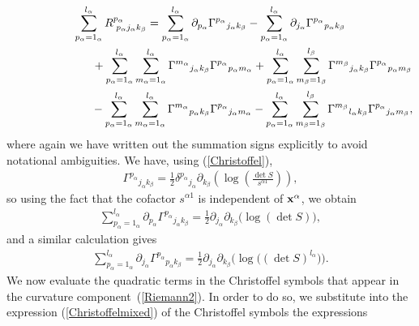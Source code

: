 \documentclass[11pt]{article}
\numberwithin{equation}{section}
\newcommand{\jalpha}{j_{\alpha}}
\newcommand{\kbeta}{k_{\beta}}
\newcommand{\malpha}{m_{\alpha}}
\newcommand{\mbeta}{m_{\beta}}
\newcommand{\lbeta}{l_{\beta}}
\newcommand{\lalpha}{l_{\alpha}}
\newcommand{\palpha}{p_{\alpha}}
\begin{document}
\begin{gather}
\sum_{\palpha=1_{\alpha}}^{\lalpha}R^{\palpha}_{{\phantom l} \palpha \jalpha \kbeta} =\sum_{\palpha=1_{\alpha}}^{\lalpha}\partial_{\palpha}{\Gamma^{\palpha}}_{\jalpha \kbeta}-\sum_{\palpha=1_{\alpha}}^{\lalpha}\partial_{\jalpha}{\Gamma^{\palpha}}_{\palpha \kbeta}\nonumber\\
\hphantom{\sum_{\palpha=1_{\alpha}}^{\lalpha}R^{\palpha}_{{\phantom l} \palpha \jalpha \kbeta} =}{}
+\sum_{\palpha=1_{\alpha}}^{\lalpha}\sum_{\malpha = 1_{\alpha}}^{\lalpha}{\Gamma^{\malpha}}_{\jalpha \kbeta}{\Gamma^{\palpha}}_{\palpha \malpha}+\sum_{\palpha=1_{\alpha}}^{\lalpha}\sum_{\mbeta=1_{\beta}}^{\lbeta}{\Gamma^{\mbeta}}_{\jalpha \kbeta}{\Gamma^{\palpha}}_{\palpha \mbeta}\nonumber\\
\hphantom{\sum_{\palpha=1_{\alpha}}^{\lalpha}R^{\palpha}_{{\phantom l} \palpha \jalpha \kbeta} =}{}-\sum_{\palpha=1_{\alpha}}^{\lalpha}\sum_{\malpha=1_{\alpha}}^{\lalpha}{\Gamma^{\malpha}}_{\palpha \kbeta}{\Gamma^{\palpha}}_{\jalpha \malpha}-\sum_{\palpha=1_{\alpha}}^{\lalpha}\sum_{\mbeta=1_{\beta}}^{\lbeta}{\Gamma^{\mbeta}}_{\lalpha \kbeta}{\Gamma^{\palpha}}_{\jalpha \mbeta},\label{Riemann2}
\end{gather}
where again we have written out the summation signs explicitly to avoid notational ambiguities. We have, using (\ref{Christoffel}),
\begin{gather}\label{moreChristoffel}
{\Gamma^{\palpha}}_{\jalpha \kbeta}=\frac{1}{2}{\delta^{\palpha}}_{\jalpha}\partial_{\kbeta}\left(\log\left(\frac{\det S}{s^{\alpha 1}}\right)\right),
\end{gather}
so using the fact that the cofactor $s^{\alpha 1}$ is independent of ${\bf x}^{\alpha}$, we obtain
\begin{gather}\label{newderiv1}
\sum_{\palpha=1_{\alpha}}^{\lalpha}\partial_{\palpha}{\Gamma^{\palpha}}_{\jalpha \kbeta}=\frac{1}{2}\partial_{\jalpha}\partial_{\kbeta}\big(\log(\det S)\big),
\end{gather}
and a similar calculation gives
\begin{gather}\label{newderiv2}
\sum_{\palpha=1_{\alpha}}^{\lalpha}\partial_{\jalpha}{\Gamma^{\palpha}}_{\palpha \kbeta}=\frac{1}{2}\partial_{\jalpha}\partial_{\kbeta}\big(\log\big((\det S)^{\lalpha}\big)\big).
\end{gather}
We now evaluate the quadratic terms in the Christoffel symbols that appear in the curvature component~(\ref{Riemann2}). In order to do so, we substitute into the expression (\ref{Christoffelmixed}) of the Christoffel symbols the expressions
\end{document}
